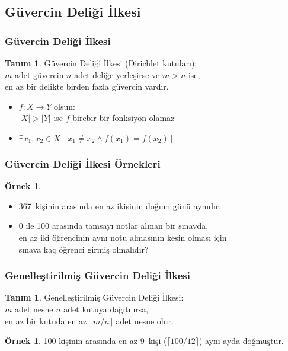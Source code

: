 \documentclass[dvipsnames]{beamer}
\theoremstyle{definition}
\newtheorem{tanim}[theorem]{Tanım}
\theoremstyle{example}
\newtheorem{ornek}[theorem]{Örnek}
\theoremstyle{plain}
\begin{document}
\subsection{Güvercin Deliği İlkesi}

\begin{frame}
  \frametitle{Güvercin Deliği İlkesi}

  \begin{tanim}
    \alert{Güvercin Deliği İlkesi} (Dirichlet kutuları):\\
    $m$ adet güvercin $n$ adet deliğe yerleşirse ve $m>n$ ise,\\
    en az bir delikte birden fazla güvercin vardır.
  \end{tanim}

  \pause
  \begin{itemize}
    \item $f: X \rightarrow Y$ olsun:\\
      $|X|>|Y|$ ise $f$ birebir bir fonksiyon olamaz

    \item $\exists x_1,x_2 \in X~[x_1 \neq x_2 \wedge f(x_1)=f(x_2)]$
  \end{itemize}
\end{frame}

\begin{frame}
  \frametitle{Güvercin Deliği İlkesi Örnekleri}

  \begin{ornek}
    \begin{itemize}
      \item 367~kişinin arasında en az ikisinin doğum günü aynıdır.

      \pause
      \item 0 ile 100 arasında tamsayı notlar alınan bir sınavda,\\
        en az iki öğrencinin aynı notu almasının kesin olması için\\
        sınava kaç öğrenci girmiş olmalıdır?
    \end{itemize}
  \end{ornek}
\end{frame}

\begin{frame}
  \frametitle{Genelleştirilmiş Güvercin Deliği İlkesi}

  \begin{tanim}
    \alert{Genelleştirilmiş Güvercin Deliği İlkesi}:\\
    $m$ adet nesne $n$ adet kutuya dağıtılırsa,\\
    en az bir kutuda en az $\lceil m / n \rceil$ adet nesne olur.
  \end{tanim}

  \pause
  \begin{ornek}
    100 kişinin arasında en az 9~kişi ($\lceil 100 / 12 \rceil$)
    aynı ayda doğmuştur.
  \end{ornek}
\end{frame}
\end{document}
